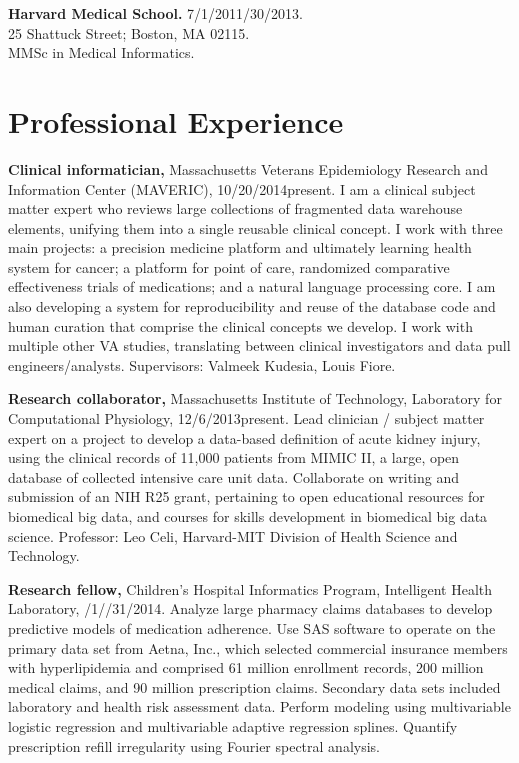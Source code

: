 \documentclass[12pt]{article}
\begin{document}
\textbf{Harvard Medical School.} 7/1/2011/30/2013.\\
25 Shattuck Street; Boston, MA 02115.\\
MMSc in Medical Informatics.

\newpage

\section*{Professional Experience} %

\textbf{Clinical informatician,} Massachusetts Veterans Epidemiology
Research and Information Center (MAVERIC), 10/20/2014\ndash{}present.
I am a clinical subject matter expert who reviews large collections of
fragmented data warehouse elements, unifying them into a single
reusable clinical concept. I work with three main projects: a
precision medicine platform and ultimately learning health system for
cancer; a platform for point of care, randomized comparative
effectiveness trials of medications; and a natural language processing
core. I am also developing a system for reproducibility and reuse of
the database code and human curation that comprise the clinical
concepts we develop. I work with multiple other VA studies,
translating between clinical investigators and data pull
engineers/analysts. Supervisors: Valmeek Kudesia, Louis Fiore.

\textbf{Research collaborator,} Massachusetts Institute of Technology,
Laboratory for Computational Physiology, 12/6/2013\ndash{}present.
Lead clinician / subject matter expert on a project to develop a
data-based definition of acute kidney injury, using the clinical
records of 11,000 patients from MIMIC II, a large, open database of
collected intensive care unit data. Collaborate on writing and
submission of an NIH R25 grant, pertaining to open educational
resources for biomedical big data, and courses for skills development
in biomedical big data science. Professor: Leo Celi, Harvard-MIT
Division of Health Science and Technology.

\textbf{Research fellow,} Children’s Hospital Informatics Program,
Intelligent Health Lab\-o\-ra\-to\-ry,
/1/\ndash{}/31/2014.
Analyze large pharmacy claims databases to develop predictive models
of medication adherence. Use SAS software to operate on the primary
data set from Aetna, Inc., which selected commercial insurance members
with hyperlipidemia and comprised 61 million enrollment records, 200
million medical claims, and 90 million prescription claims. Secondary
data sets included laboratory and health risk assessment data. Perform
modeling using multivariable logistic regression and multivariable
adaptive regression splines. Quantify prescription refill irregularity
using Fourier spectral analysis.
\end{document}
